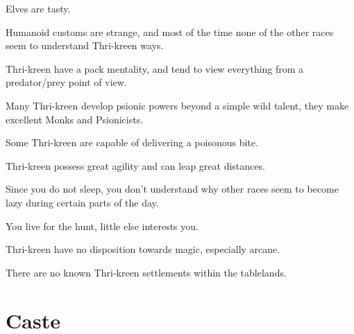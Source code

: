 \begin{multicols}{2}
\begin{description}
    \item Elves are tasty.
    \item Humanoid customs are strange, and most of the time none of the other races seem to understand Thri-kreen ways.
    \item Thri-kreen have a pack mentality, and tend to view everything from a predator/prey point of view.
    \item Many Thri-kreen develop psionic powers beyond a simple wild talent, they make excellent Monks and Psionicists.
    \item Some Thri-kreen are capable of delivering a poisonous bite.
    \item Thri-kreen possess great agility and can leap great distances.
    \item Since you do not sleep, you don’t understand why other races seem to become lazy during certain parts of the day.
    \item You live for the hunt, little else interests you.
    \item Thri-kreen have no disposition towards magic, especially arcane.
    \item There are no known Thri-kreen settlements within the tablelands.
\end{description}

\end{multicols}

\section{Caste}

